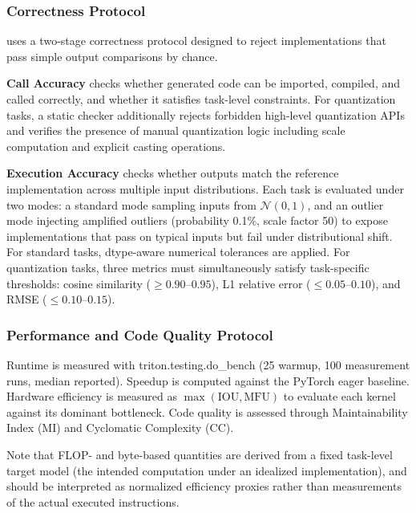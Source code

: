 \subsubsection{Correctness Protocol}

\oursys uses a two-stage correctness protocol designed to reject implementations that pass simple output comparisons by chance.

\textbf{Call Accuracy} checks whether generated code can be imported, compiled, and called correctly, and whether it satisfies task-level constraints. For quantization tasks, a static checker additionally rejects forbidden high-level quantization APIs and verifies the presence of manual quantization logic including scale computation and explicit casting operations.

\textbf{Execution Accuracy} checks whether outputs match the reference implementation across multiple input distributions. Each task is evaluated under two modes: a standard mode sampling inputs from $\mathcal{N}(0,1)$, and an outlier mode injecting amplified outliers (probability 0.1\%, scale factor 50) to expose implementations that pass on typical inputs but fail under distributional shift. For standard tasks, dtype-aware numerical tolerances are applied. For quantization tasks, three metrics must simultaneously satisfy task-specific thresholds: cosine similarity ($\geq 0.90$--$0.95$), L1 relative error ($\leq 0.05$--$0.10$), and RMSE ($\leq 0.10$--$0.15$).


\subsubsection{Performance and Code Quality Protocol}

Runtime is measured with triton.testing.do\_bench (25 warmup, 100 measurement runs, median reported). Speedup is computed against the PyTorch eager baseline.
Hardware efficiency is measured as $\max(\mathrm{IOU}, \mathrm{MFU})$ to evaluate each kernel against its dominant bottleneck. Code quality is assessed through Maintainability Index (MI) and Cyclomatic Complexity (CC).

Note that FLOP- and byte-based quantities are derived from a fixed task-level target model (the intended computation under an idealized implementation), and should be interpreted as normalized efficiency proxies rather than measurements of the actual executed instructions.